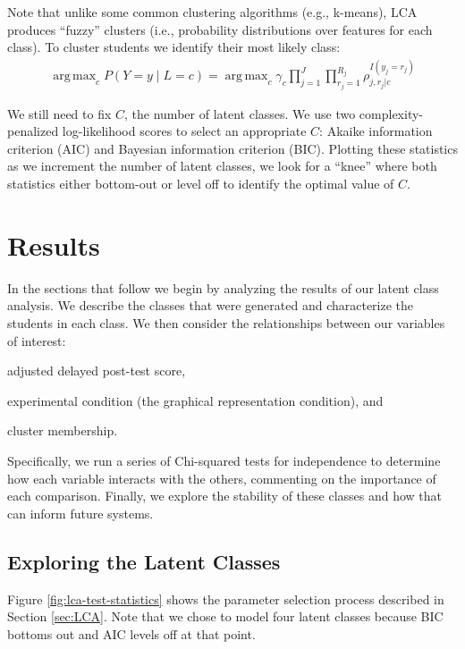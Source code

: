 \documentclass{edm_template}
\DeclareMathOperator*{\argmax}{arg\,max}
\begin{document}
Note that unlike some common clustering algorithms (e.g., k-means), LCA produces ``fuzzy'' clusters (i.e., probability distributions over features for each class). To cluster students we identify their most likely class:
\begin{align}
\argmax_{c} P(Y = y \;|\; L = c) = \argmax_{c} \gamma_{c} \prod_{j=1}^{J} \prod_{r_{j}=1}^{R_{j}} \rho_{j,r_{j}|c}^{I(y_{j} = r_{j})}
\label{eqn:LCA-argmax}
\end{align}

We still need to fix $C$, the number of latent classes. We use two complexity-penalized log-likelihood scores to select an appropriate $C$: Akaike information criterion (AIC) and Bayesian information criterion (BIC). Plotting these statistics as we increment the number of latent classes, we look for a ``knee'' where both statistics either bottom-out or level off to identify the optimal value of $C$.

\section{Results}
\label{sec:results}

In the sections that follow we begin by analyzing the results of our latent class analysis. We describe the classes that were generated and characterize the students in each class. We then consider the relationships between our variables of interest: 
\begin{inparaenum}[\itshape (a)]
\item adjusted delayed post-test score,
\item experimental condition (the graphical representation condition), and
\item cluster membership.
\end{inparaenum}
Specifically, we run a series of Chi-squared tests for independence to determine how each variable interacts with the others, commenting on the importance of each comparison. Finally, we explore the stability of these classes and how that can inform future systems.

\subsection{Exploring the Latent Classes}

Figure \ref{fig:lca-test-statistics} shows the parameter selection process described in Section \ref{sec:LCA}. Note that we chose to model four latent classes because BIC bottoms out and AIC levels off at that point.
\end{document}
